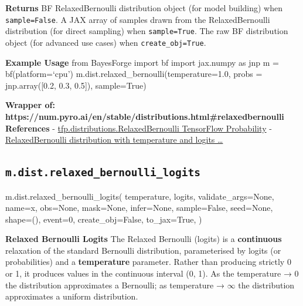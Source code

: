 \documentclass[
  letterpaper,
  DIV=11,
  numbers=noendperiod]{scrartcl}
\newenvironment{Shaded}{\begin{snugshade}}{\end{snugshade}}
\newcommand{\DecValTok}[1]{\textcolor[rgb]{0.68,0.00,0.00}{#1}}
\newcommand{\NormalTok}[1]{\textcolor[rgb]{0.00,0.23,0.31}{#1}}
\newcommand{\OperatorTok}[1]{\textcolor[rgb]{0.37,0.37,0.37}{#1}}
\newcommand{\StringTok}[1]{\textcolor[rgb]{0.13,0.47,0.30}{#1}}
\newcommand{\VariableTok}[1]{\textcolor[rgb]{0.07,0.07,0.07}{#1}}
\begin{document}
\textbf{Returns} BF RelaxedBernoulli distribution object (for model
building) when \texttt{sample=False}. A JAX array of samples drawn from
the RelaxedBernoulli distribution (for direct sampling) when
\texttt{sample=True}. The raw BF distribution object (for advanced use
cases) when \texttt{create\_obj=True}.

\textbf{Example Usage} from BayesForge import bf import jax.numpy as jnp
m = bf(platform=`cpu') m.dist.relaxed\_bernoulli(temperature=1.0, probs
= jnp.array({[}0.2, 0.3, 0.5{]}), sample=True)

\textbf{Wrapper of:
https://num.pyro.ai/en/stable/distributions.html\#relaxedbernoulli}
\textbf{References} -
\href{https://www.tensorflow.org/probability/api_docs/python/tfp/distributions/RelaxedBernoulli}{tfp.distributions.RelaxedBernoulli
\textbar{} TensorFlow Probability} -
\href{https://rstudio.github.io/tfprobability/reference/tfd_relaxed_bernoulli.html}{RelaxedBernoulli
distribution with temperature and logits \ldots{}}

\subsection{\texorpdfstring{\texttt{m.dist.relaxed\_bernoulli\_logits}}{m.dist.relaxed\_bernoulli\_logits}}\label{relaxed_bernoulli_logits}

\begin{Shaded}
\begin{Highlighting}[]
\NormalTok{m.dist.relaxed\_bernoulli\_logits(}
\NormalTok{    temperature,}
\NormalTok{    logits,}
\NormalTok{    validate\_args}\OperatorTok{=}\VariableTok{None}\NormalTok{,}
\NormalTok{    name}\OperatorTok{=}\StringTok{\textquotesingle{}x\textquotesingle{}}\NormalTok{,}
\NormalTok{    obs}\OperatorTok{=}\VariableTok{None}\NormalTok{,}
\NormalTok{    mask}\OperatorTok{=}\VariableTok{None}\NormalTok{,}
\NormalTok{    infer}\OperatorTok{=}\VariableTok{None}\NormalTok{,}
\NormalTok{    sample}\OperatorTok{=}\VariableTok{False}\NormalTok{,}
\NormalTok{    seed}\OperatorTok{=}\VariableTok{None}\NormalTok{,}
\NormalTok{    shape}\OperatorTok{=}\NormalTok{(),}
\NormalTok{    event}\OperatorTok{=}\DecValTok{0}\NormalTok{,}
\NormalTok{    create\_obj}\OperatorTok{=}\VariableTok{False}\NormalTok{,}
\NormalTok{    to\_jax}\OperatorTok{=}\VariableTok{True}\NormalTok{,}
\NormalTok{)}
\end{Highlighting}
\end{Shaded}

\textbf{Relaxed Bernoulli Logits} The Relaxed Bernoulli (logits) is a
\textbf{continuous} relaxation of the standard Bernoulli distribution,
parameterised by logits (or probabilities) and a \textbf{temperature}
parameter. Rather than producing strictly 0 or 1, it produces values in
the continuous interval (0, 1). As the temperature → 0 the distribution
approximates a Bernoulli; as temperature → \(\infty\) the distribution
approximates a uniform distribution.
\end{document}
